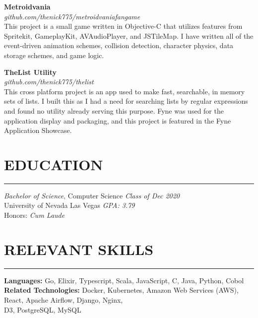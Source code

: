 \documentclass{res}
\begin{document}
\begin{resume}
		{\bf Metroidvania} \\
			\emph{github.com/thenick775/metroidvaniafangame} \hfill \vspace{3pt} \\
			This project is a small game written in Objective-C that utilizes features from Spritekit, GameplayKit, AVAudioPlayer, and JSTileMap. I have written all of the event-driven animation schemes, collision detection, character physics, data storage schemes, and game logic.
\vspace{-4pt}

		{\bf TheList Utility} \\
			\emph{github.com/thenick775/thelist} \hfill \vspace{3pt} \\
			This cross platform project is an app used to make fast, searchable, in memory sets of lists. I built this as I had a need for searching lists by regular expressions and found no utility already serving this purpose. Fyne was used for the application display and packaging, and this project is featured in the Fyne Application Showcase.

\begin{comment}
\vspace{-4pt}

		{\bf Terbine Map Visualization} \\
			\emph{github.com/thenick775/Terbine-Map} \hfill \vspace{3pt} \\
			This was a fun exercise in data visualization, where fixed coordinate data points in Terbine were plotted and connected on an interactive world map. The data mining was done using Selenium in Python, and data visualization was accomplished using Mapbox in R.
\end{comment}

\vspace{-4pt}

		\section{{EDUCATION}}
    \noindent\rule[0.5ex]{\linewidth}{1pt}
		{\sl Bachelor of Science}, Computer Science \hfill \emph{Class of Dec 2020} \\
		University of Nevada Las Vegas \hfill \emph{GPA: 3.79} \\ Honors: \hfill \emph{Cum Laude} \\ \vspace{-5mm}

		\section{{RELEVANT SKILLS}}
    \noindent\rule[0.5ex]{\linewidth}{1pt}
			{\bf Languages:} Go, Elixir, Typescript, Scala, JavaScript, C, Java, Python, Cobol\\
			{\bf Related Technologies:} Docker, Kubernetes, Amazon Web Services (AWS), React, Apache Airflow, Django, Nginx,\ \\ D3, PostgreSQL, MySQL

	\end{resume}
\end{document}
